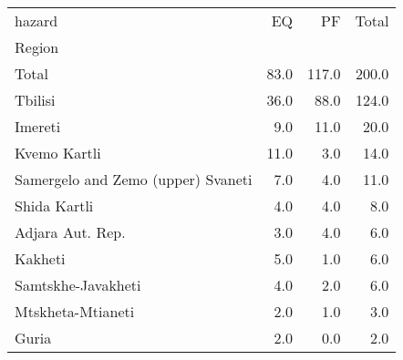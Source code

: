 \begin{tabular}{lrrr}
\toprule
hazard &    EQ &     PF &  Total \\
Region                             &       &        &        \\
\midrule
Total                              &  83.0 &  117.0 &  200.0 \\
Tbilisi                            &  36.0 &   88.0 &  124.0 \\
Imereti                            &   9.0 &   11.0 &   20.0 \\
Kvemo Kartli                       &  11.0 &    3.0 &   14.0 \\
Samergelo and Zemo (upper) Svaneti &   7.0 &    4.0 &   11.0 \\
Shida Kartli                       &   4.0 &    4.0 &    8.0 \\
Adjara Aut. Rep.                   &   3.0 &    4.0 &    6.0 \\
Kakheti                            &   5.0 &    1.0 &    6.0 \\
Samtskhe-Javakheti                 &   4.0 &    2.0 &    6.0 \\
Mtskheta-Mtianeti                  &   2.0 &    1.0 &    3.0 \\
Guria                              &   2.0 &    0.0 &    2.0 \\
\bottomrule
\end{tabular}
